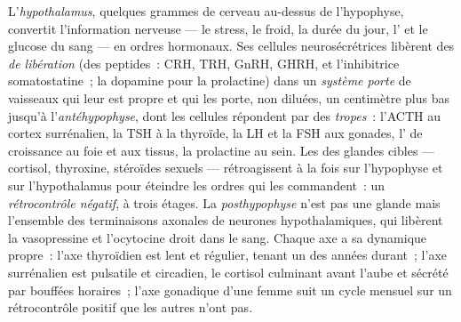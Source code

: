 \begin{definition}\label{def:b3:endocrinology:axes}
L'\emph{hypothalamus}, quelques grammes de cerveau au-dessus de
l'hypophyse, convertit l'information nerveuse --- le stress, le froid,
la durée du jour, l' et le glucose du sang --- en ordres
hormonaux. Ses cellules neurosécrétrices libèrent des \emph{ de
libération} (des peptides~: CRH, TRH, GnRH, GHRH, et l'inhibitrice
somatostatine~; la dopamine pour la prolactine) dans un \emph{système
porte} de vaisseaux qui leur est propre et qui les porte, non diluées,
un centimètre plus bas jusqu'à l'\emph{antéhypophyse}, dont les cellules
répondent par des \emph{ tropes}~: l'ACTH au cortex surrénalien,
la TSH à la thyroïde, la LH et la FSH aux gonades, l' de
croissance au foie et aux tissus, la prolactine au sein. Les 
des glandes cibles --- cortisol, thyroxine, stéroïdes sexuels ---
rétroagissent à la fois sur l'hypophyse et sur l'hypothalamus pour
éteindre les ordres qui les commandent~: un \emph{rétrocontrôle négatif},
à trois étages. La \emph{posthypophyse} n'est pas une glande mais
l'ensemble des terminaisons axonales de neurones hypothalamiques, qui
libèrent la vasopressine et l'ocytocine droit dans le sang. Chaque axe a
sa dynamique propre~: l'axe thyroïdien est lent et régulier, tenant un
 des années durant~; l'axe surrénalien est pulsatile et
circadien, le cortisol culminant avant l'aube et sécrété par bouffées
horaires~; l'axe gonadique d'une femme suit un cycle mensuel sur un
rétrocontrôle positif que les autres n'ont pas.
\end{definition}

